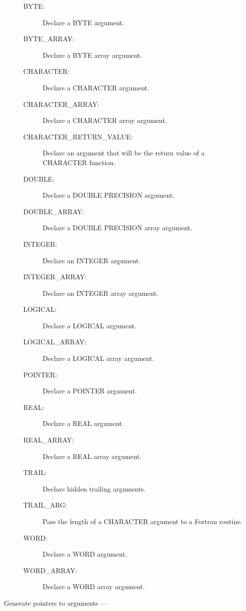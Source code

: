 \begin{description}
\begin{description}
\item [BYTE:]  Declare a BYTE argument.
\item [BYTE\_ARRAY:]  Declare a BYTE array argument.
\item [CHARACTER:]  Declare a CHARACTER argument.
\item [CHARACTER\_ARRAY:]  Declare a CHARACTER array argument.
\item [CHARACTER\_RETURN\_VALUE:]  Declare an argument that will be the return value of a CHARACTER function.
\item [DOUBLE:]  Declare a DOUBLE PRECISION argument.
\item [DOUBLE\_ARRAY:]  Declare a DOUBLE PRECISION array argument.
\item [INTEGER:]  Declare an INTEGER argument.
\item [INTEGER\_ARRAY:]  Declare an INTEGER array argument.
\item [LOGICAL:]  Declare a LOGICAL argument.
\item [LOGICAL\_ARRAY:]  Declare a LOGICAL array argument.
\item [POINTER:]  Declare a POINTER argument.
\item [REAL:]  Declare a REAL argument.
\item [REAL\_ARRAY:]  Declare a REAL array argument.
\item [TRAIL:]  Declare hidden trailing arguments.
\item [TRAIL\_ARG:]  Pass the length of a CHARACTER argument to a Fortran routine.
\item [WORD:]  Declare a WORD argument.
\item [WORD\_ARRAY:]  Declare a WORD array argument.
\end{description}

\item [Generate pointers to arguments ---]


\end{description}
